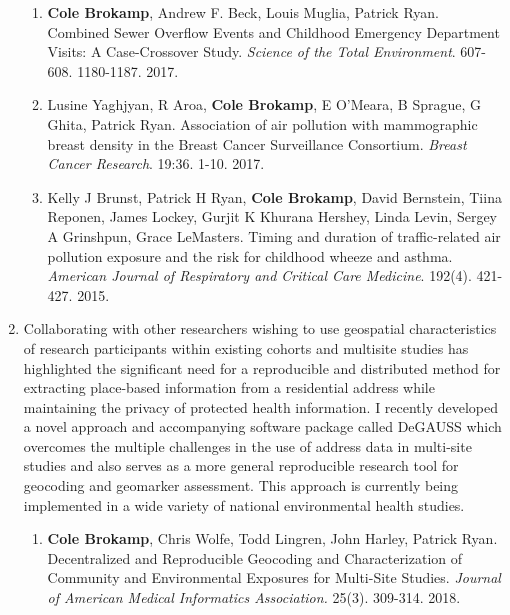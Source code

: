 \documentclass{nihbiosketch}
\begin{document}
\begin{enumerate}
\begin{enumerate}
	
	\item \textbf{Cole Brokamp}, Andrew F. Beck, Louis Muglia, Patrick Ryan. Combined Sewer Overflow Events and Childhood Emergency Department Visits: A Case-Crossover Study. \textit{Science of the Total Environment}. 607-608. 1180-1187. 2017.
	
	\item Lusine Yaghjyan, R Aroa, \textbf{Cole Brokamp}, E O'Meara, B Sprague, G Ghita, Patrick Ryan. Association of air pollution with mammographic breast density in the Breast Cancer Surveillance Consortium. \textit{Breast Cancer Research}. 19:36. 1-10. 2017.
	
		\item Kelly J Brunst, Patrick H Ryan, \textbf{Cole Brokamp}, David Bernstein, Tiina Reponen, James Lockey, Gurjit K Khurana Hershey, Linda Levin, Sergey A Grinshpun, Grace LeMasters. Timing and duration of traffic-related air pollution exposure and the risk for childhood wheeze and asthma. \textit{American Journal of Respiratory and Critical Care Medicine}. 192(4). 421-427. 2015.
	

	
	
\end{enumerate}

\item Collaborating with other researchers wishing to use geospatial characteristics of research participants within existing cohorts and multisite studies has highlighted the significant need for a reproducible and distributed method for extracting place-based information from a residential address while maintaining the privacy of protected health information. I recently developed a novel approach and accompanying software package called DeGAUSS which overcomes the multiple challenges in the use of address data in multi-site studies and also serves as a more general reproducible research tool for geocoding and geomarker assessment. This approach is currently being implemented in a wide variety of national environmental health studies.

\begin{enumerate}

	\item \textbf{Cole Brokamp}, Chris Wolfe, Todd Lingren, John Harley, Patrick Ryan. Decentralized and Reproducible Geocoding and Characterization of Community and Environmental Exposures for Multi-Site Studies. \textit{Journal of American Medical Informatics Association.} 25(3). 309-314. 2018.
		

\end{enumerate}
\end{enumerate}
\end{document}
